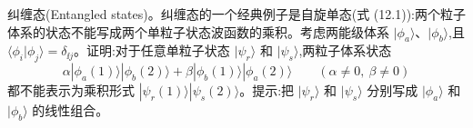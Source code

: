 \begin{question}
纠缠态(Entangled states)。纠缠态的一个经典例子是自旋单态(式 (12.1)):两个粒子体系的状态不能写成两个单粒子状态波函数的乘积。考虑两能级体系 $|\phi_a\rangle$、$|\phi_b\rangle$,且 $\langle\phi_i|\phi_j\rangle=\delta_{\ii j}$。证明:对于任意单粒子状态 $|\psi_r\rangle$ 和 $|\psi_s\rangle$,两粒子体系状态
\[
\alpha|\phi_a(1)\rangle|\phi_b(2)\rangle+\beta|\phi_b(1)\rangle|\phi_a(2)\rangle\qquad(\alpha\ne0,\ \beta\ne0)
\]
都不能表示为乘积形式 $|\psi_r(1)\rangle|\psi_s(2)\rangle$。提示:把 $|\psi_r\rangle$ 和 $|\psi_s\rangle$ 分别写成 $|\phi_a\rangle$ 和 $|\phi_b\rangle$ 的线性组合。

\par\smallskip
{}

\end{question}
